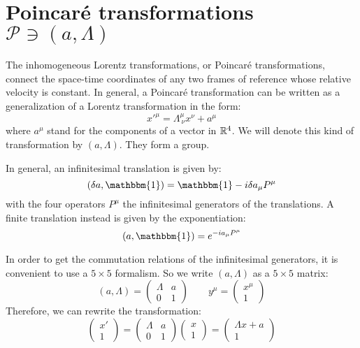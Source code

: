 \documentclass[../../main/main.tex]{subfiles}
\begin{document}
\section{Poincaré transformations \( \mathcal{P} \ni (a,\Lambda) \)}
The inhomogeneous Lorentz transformations, or Poincaré transformations, connect the space-time coordinates of any two frames of reference whose relative velocity is constant. In general, a Poincaré transformation can be written as a generalization of a Lorentz transformation in the form:
\begin{equation}
    {x'}^\mu = \Lambda^{\mu}_{\ \nu} x^\nu + a^\mu
    \label{eq:POINC}
\end{equation}
where \( a^\mu  \) stand for the components of a vector in \( \mathbb{R}^4 \). We will denote this kind of transformation by \( (a,\Lambda) \). They form a group.

In general, an infinitesimal translation is given by:
\begin{equation}
    (\delta a, \mathbbm{1}) = \mathbbm{1} - i \delta a_\mu P^\mu
    \label{eq:INF_TRAN_POINC}
\end{equation}
with the four operators \( P^\mu \) the infinitesimal generators of the translations. A finite translation instead is given by the exponentiation:
\begin{equation}
    (a,\mathbbm{1}) = e^{-i a_\mu P^\mu}
    \label{eq:FIN_TRAN_POINC}
\end{equation}

In order to get the commutation relations of the infinitesimal generators, it is convenient to use a \( 5\times 5 \) formalism. So we write \( (a,\Lambda ) \) as a \( 5 \times 5 \) matrix:
\[
    (a, \Lambda ) =
    \left(
    \begin{array}{c|c}
        \Lambda &   a   \\
        \hline
        0   &   1
    \end{array}
    \right)
    \qquad
    y^\mu = \begin{pmatrix}
    x^\mu \\
    1
    \end{pmatrix}
\]
Therefore, we can rewrite the transformation:
\begin{equation}
    \begin{pmatrix}
    x' \\
    1
    \end{pmatrix}
    =
    \begin{pmatrix}
    \Lambda    & a  \\
    0   & 1
    \end{pmatrix}
    \begin{pmatrix}
    x \\
    1
    \end{pmatrix}
    =
    \begin{pmatrix}
    \Lambda x +a \\
    1
    \end{pmatrix}
    \label{eq:}
\end{equation}
\end{document}
